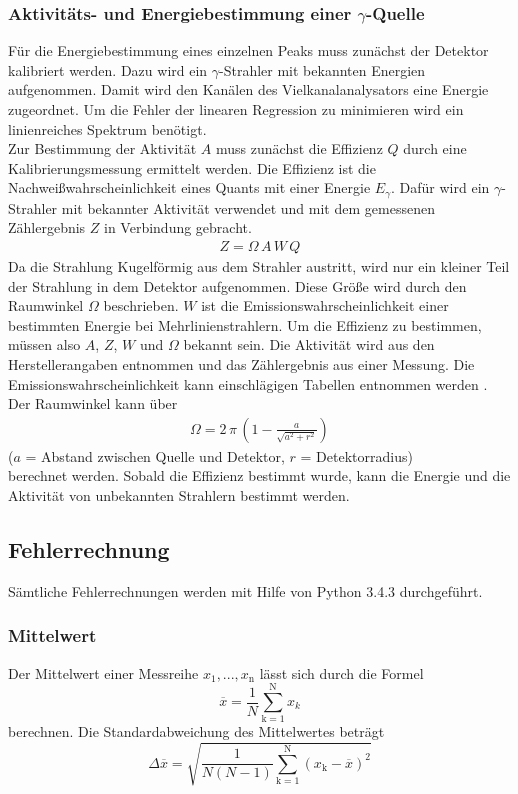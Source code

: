 \subsubsection{Aktivitäts- und Energiebestimmung einer \texorpdfstring{$\gamma$}{}-Quelle}
Für die Energiebestimmung eines einzelnen Peaks muss zunächst der Detektor kalibriert werden. Dazu wird ein $\gamma$-Strahler mit bekannten Energien aufgenommen. Damit wird den Kanälen des Vielkanalanalysators eine Energie zugeordnet. Um die Fehler der linearen Regression zu minimieren wird ein linienreiches Spektrum benötigt. \\
Zur Bestimmung der Aktivität $A$ muss zunächst die Effizienz $Q$ durch eine Kalibrierungsmessung ermittelt werden. Die Effizienz ist die Nachweißwahrscheinlichkeit eines Quants mit einer Energie $E_\gamma$. Dafür wird ein $\gamma$-Strahler mit bekannter Aktivität verwendet und mit dem gemessenen Zählergebnis $Z$ in Verbindung gebracht.
\begin{align}
	Z = \Omega\,A\,W\,Q
\end{align}
Da die Strahlung Kugelförmig aus dem Strahler austritt, wird nur ein kleiner Teil der Strahlung in dem Detektor aufgenommen. Diese Größe wird durch den Raumwinkel $\Omega$ beschrieben. $W$ ist die Emissionswahrscheinlichkeit einer bestimmten Energie bei Mehrlinienstrahlern. Um die Effizienz zu bestimmen, müssen also $A$, $Z$, $W$ und $\Omega$ bekannt sein. Die Aktivität wird aus den Herstellerangaben entnommen und das Zählergebnis aus einer Messung. Die Emissionswahrscheinlichkeit kann einschlägigen Tabellen entnommen werden \cite{V18}. Der Raumwinkel kann über
\begin{align}
	\Omega = 2\,\pi\,\left(1 - \frac{a}{\sqrt{a^2 + r^2}} \right)
\end{align}
\hfil {\footnotesize($a$ = Abstand zwischen Quelle und Detektor, $r$ = Detektorradius)} \hfil \\
berechnet werden. Sobald die Effizienz bestimmt wurde, kann die Energie und die Aktivität von unbekannten Strahlern bestimmt werden.









\subsection{Fehlerrechnung}
Sämtliche Fehlerrechnungen werden mit Hilfe von Python 3.4.3 durchgeführt.
\subsubsection{Mittelwert}
Der Mittelwert einer Messreihe $x_\text{1}, ... ,x_\text{n}$ lässt sich durch die Formel
\begin{equation}
	\overline{x} = \frac{1}{N} \sum_{\text{k}=1}^\text{N} x_k
	\label{eqn:ave}
\end{equation}
berechnen. Die Standardabweichung des Mittelwertes beträgt
\begin{equation}
	\Delta \overline{x} = \sqrt{ \frac{1}{N(N-1)} \sum_{\text{k}=1}^\text{N} (x_\text{k} - \overline{x})^2}
	\label{eqn:std}
\end{equation}

